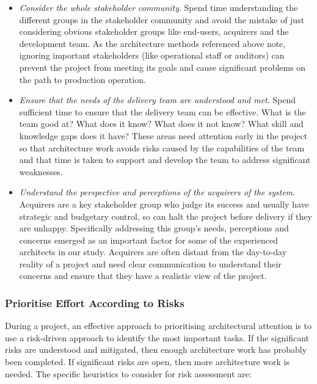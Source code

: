 \begin{itemize}
	\item \emph{Consider the whole stakeholder community}. Spend time understanding the different groups in the stakeholder community and avoid the mistake of just considering obvious stakeholder groups like end-users, acquirers and the development team.  As the architecture methods referenced above note, ignoring important stakeholders (like operational staff or auditors) can prevent the project from meeting its goals and cause significant problems on the path to production operation.
	\item \emph{Ensure that the needs of the delivery team are understood and met}.  Spend sufficient time to ensure that the delivery team can be effective.  What is the team good at?  What does it know?  What does it not know?  What skill and knowledge gaps does it have?  These areas need attention early in the project so that architecture work avoids risks caused by the capabilities of the team and that time is taken to support and develop the team to address significant weaknesses.
	\item \emph{Understand the perspective and perceptions of the acquirers of the system}.  Acquirers are a key stakeholder group who judge its success and usually have strategic and budgetary control, so can halt the project before delivery if they are unhappy.  Specifically addressing this group's needs, perceptions and concerns emerged as an important factor for some of the experienced architects in our study.  Acquirers are often distant from the day-to-day reality of a project and need clear communication to understand their concerns and ensure that they have a realistic view of the project.
\end{itemize}

\subsubsection{Prioritise Effort According to Risks}

During a project, an effective approach to prioritising architectural attention is to use a risk-driven approach to identify the most important tasks.  If the significant risks are understood and mitigated, then enough architecture work has probably been completed.  If significant risks are open, then more architecture work is needed. The specific heuristics to consider for risk assessment are:


